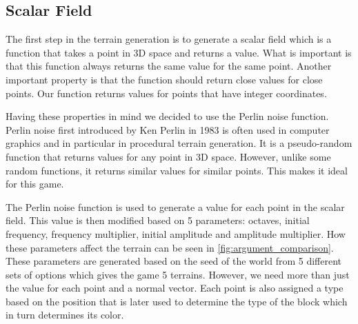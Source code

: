 \subsection{Scalar Field} \label{subsec:scalar_field}
The first step in the terrain generation is to generate a scalar field which is a function that takes a point in 3D space and returns a value.
What is important is that this function always returns the same value for the same point.
Another important property is that the function should return close values for close points.
Our function returns values for points that have integer coordinates.

Having these properties in mind we decided to use the Perlin noise function.
Perlin noise first introduced by Ken Perlin in 1983 \cite{Perlin-Noise} is often used in computer graphics and in particular in procedural terrain generation.
It is a pseudo-random function that returns values for any point in 3D space.
However, unlike some random functions, it returns similar values for similar points.
This makes it ideal for this game.

The Perlin noise function is used to generate a value for each point in the scalar field.
This value is then modified based on 5 parameters: octaves, initial frequency, frequency multiplier, initial amplitude and amplitude multiplier.
How these parameters affect the terrain can be seen in \autoref{fig:argument_comparison}.
These parameters are generated based on the seed of the world from 5 different sets of options which gives the game 5 terrains.
However, we need more than just the value for each point and a normal vector.
Each point is also assigned a type based on the position that is later used to determine the type of the block which in turn determines its color.

